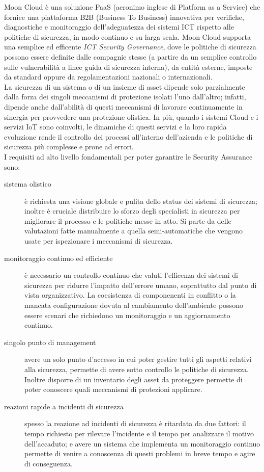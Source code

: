 Moon Cloud è una soluzione PaaS (acronimo inglese di Platform as a Service) che fornice una piattaforma B2B (Business To Business) 
innovativa per verifiche, diagnostiche e monitoraggio dell'adeguatezza dei sistemi ICT rispetto alle politiche di sicurezza, in modo 
continuo e su larga scala. Moon Cloud supporta una semplice ed efficente \textit{ICT Security Governance}, dove le politiche di sicurezza 
possono essere definite dalle compagnie stesse (a partire da un semplice controllo sulle vulnerabilità a linee guida di
sicurezza interna), da entità esterne, imposte da standard oppure da regolamentazioni nazionali o internazionali.\\
La sicurezza di un sistema o di un insieme di asset dipende solo parzialmente dalla forza dei singoli meccanismi di protezione isolati
l'uno dall'altro; infatti, dipende anche dall'abilità di questi meccanismi di lavorare continuamente in sinergia per provvedere una 
protezione olistica.
In più, quando i sistemi Cloud e i servizi IoT sono coinvolti, le dinamiche di questi servizi e la loro rapida evoluzione rende il 
controllo dei processi all'interno dell'azienda e le politiche di sicurezza più complesse e prone ad errori.\\
I requisiti ad alto livello fondamentali per poter garantire le Security Assurance sono:
\begin{description}
	\item[sistema olistico] è richiesta una visione globale e pulita dello status dei sistemi di sicurezza; inoltre è cruciale 
	distribuire lo sforzo degli specialisti in sicurezza per migliorare il processo e le politiche messe in atto. Si parte da 
	delle valutazioni fatte manualmente a quella semi-automatiche che vengono usate per ispezionare i meccanismi di sicurezza. 
	\item[monitoraggio continuo ed efficiente] è necessario un controllo continuo che valuti l'efficenza dei sistemi di sicurezza 
	per ridurre l'impatto dell'errore umano, soprattutto dal punto di vista organizzativo. La coesistenza di componenenti in conflitto o
	la mancata configurazione dovuta al	cambiamento dell'ambiente possono essere scenari che richiedono un monitoraggio e un 
	aggiornamento continuo.
	\item[singolo punto di management] avere un solo punto d'accesso in cui poter gestire tutti gli aspetti relativi alla sicurezza, 
	permette di avere sotto controllo le politiche di sicurezza. Inoltre disporre di un inventario degli asset da proteggere permette di
	poter conoscere quali meccanismi di protezioni applicare.
	\item[reazioni rapide a incidenti di sicurezza] spesso la reazione ad incidenti di sicurezza è ritardata da due fattori: il tempo 
	richiesto per rilevare l'incidente e il tempo per analizzare il motivo dell'accaduto; e avere un sistema che implementa un monitoraggio
	continuo permette di venire a conoscenza di questi problemi in breve tempo e agire di conseguenza.
	\label{list:security-assurance-fondamentals}
\end{description}
